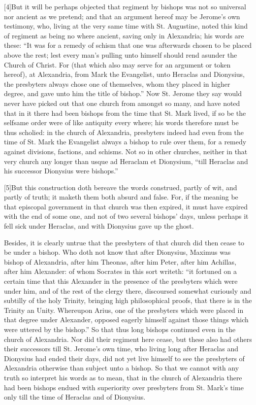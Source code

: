 [4]But it will be perhaps objected that regiment by bishops was not so universal nor ancient as we pretend; and that an argument hereof may be Jerome’s own testimony, who, living at the very same time with St. Augustine, noted this kind of regiment as being no where ancient, saving only in Alexandria; his words are these: “It was for a remedy of schism that one was afterwards chosen to be placed above the rest; lest every man’s pulling unto himself should rend asunder the Church of Christ. For (that which also may serve for an argument or token hereof), at Alexandria, from Mark the Evangelist, unto Heraclas and Dionysius, the presbyters always chose one of themselves, whom they placed in higher degree, and gave unto him the title of bishop.” Now St. Jerome they say would never have picked out that one church from amongst so many, and have noted that in it there had been bishops from the time that St. Mark lived, if so be the selfsame order were of like antiquity every where; his words therefore must be thus scholied: in the church of Alexandria, presbyters indeed had even from the time of St. Mark the Evangelist always a bishop to rule over them, for a remedy against divisions, factions, and schisms. Not so in other churches, neither in that very church any longer than usque ad Heraclam et Dionysium, “till Heraclas and his successor Dionysius were bishops.”

[5]But this construction doth bereave the words construed, partly of wit, and partly of truth; it maketh them both absurd and false. For, if the meaning be that episcopal government in that church was then expired, it must have expired with the end of some one, and not of two several bishops’ days, unless perhaps it fell sick under Heraclas, and with Dionysius gave up the ghost.

Besides, it is clearly untrue that the presbyters of that church did then cease to be under a bishop. Who doth not  know that after Dionysius,
 Maximus was bishop of Alexandria, after him Theonas, after him Peter, after him Achillas, after him Alexander: of whom Socrates in this sort writeth: “it fortuned on a certain time that this Alexander in the presence of the presbyters which were under him, and of the rest of the clergy there, discoursed somewhat curiously and subtilly of the holy Trinity, bringing high philosophical proofs, that there is in the Trinity an Unity. Whereupon Arius, one of the presbyters which were placed in that degree under Alexander, opposed eagerly himself against those things which were uttered by the bishop.” So that thus long bishops continued even in the church of Alexandria. Nor did their regiment here cease, but these also had others their successors till St. Jerome’s own time, who living long after Heraclas and Dionysius had ended their days, did not yet live himself to see the presbyters of Alexandria otherwise than subject unto a bishop. So that we cannot with any truth so interpret his words as to mean, that in the church of Alexandria there had been bishops endued with superiority over presbyters from St. Mark’s time only till the time of Heraclas and of Dionysius.

